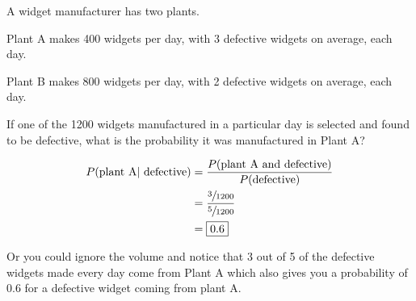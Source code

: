 \documentclass[landscape]{exam}
\begin{document}
\begin{questions}

    \question[5] A widget manufacturer has two plants. 
    
    \begin{itemize*}
      \item Plant A makes 400 widgets per day, with 3 defective widgets on
        average, each day.
      \item Plant B makes 800 widgets per day, with 2 defective widgets on
        average, each day.
    \end{itemize*}

    If one of the 1200 widgets manufactured in a particular day is selected and
    found to be defective, what is the probability it was manufactured in Plant
    A\@?

    \begin{solution}
      \begin{align*}
        P(\text{plant A} | \text{ defective}) & = \frac{P(\text{plant A and defective})}{P(\text{defective})} \\
                                              & = \frac{ \sfrac{3}{1200} }{ \sfrac{5}{1200} } \\
                                              & = \boxed{ 0.6 } \\
      \end{align*}

      Or you could ignore the volume and notice that 3 out of 5 of the defective
      widgets made every day come from Plant A which also gives you a
      probability of 0.6 for a defective widget coming from plant A.
    \end{solution}


\end{questions}
\end{document}
